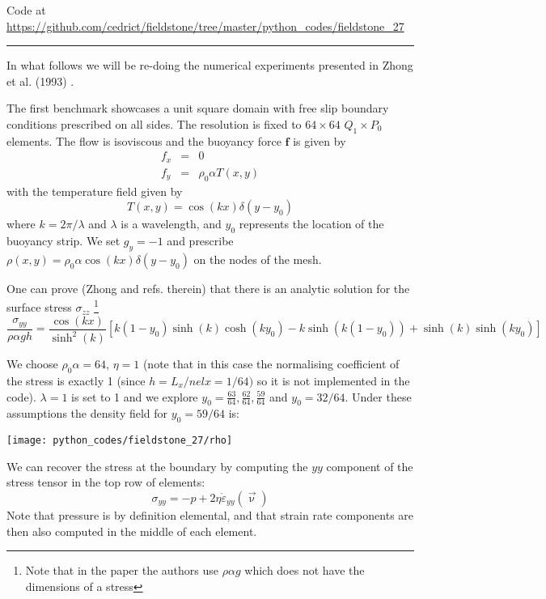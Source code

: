 

\begin{center}
Code at \url{https://github.com/cedrict/fieldstone/tree/master/python_codes/fieldstone_27}
\end{center}

\par\noindent\rule{\textwidth}{0.4pt}


In what follows we will be re-doing the numerical experiments presented in 
Zhong et al. (1993) \cite{zhgh93}.

The first benchmark showcases a unit square domain with free slip 
boundary conditions prescribed on all sides.
The resolution is fixed to $64\times64$ $Q_1 \times P_0$ elements. 
The flow is isoviscous and the buoyancy force ${\bm f}$ is given by 
\begin{eqnarray}
f_x &=& 0 \nonumber\\
f_y &=& \rho_0 \alpha T(x,y) \nonumber
\end{eqnarray}
with the temperature field given by 
\[
T(x,y) = \cos(kx) \delta(y-y_0)
\]
where $k=2\pi/\lambda$ and $\lambda$ is a wavelength, 
and $y_0$ represents the location of the buoyancy strip.
We set $g_y=-1$ and prescribe $\rho(x,y)=\rho_0 \alpha \cos(kx) \delta(y-y_0)$ on the nodes
of the mesh.

One can prove (Zhong \etal \cite{zhgh93} and refs. therein) that 
there is an analytic solution for the surface stress $\sigma_{zz}$
\footnote{Note that in the paper the authors use $\rho \alpha g$ which does not have the 
dimensions of a stress}
\[
\frac{\sigma_{yy}}{\rho \alpha g h} =
\frac{\cos (kx)}{\sinh^2(k)}
\left[
k(1-y_0)\sinh(k) \cosh(ky_0)-k \sinh(k(1-y_0))
+\sinh(k) \sinh(ky_0)
\right]
\]

We choose $\rho_0 \alpha = 64$, $\eta=1$ (note that in this case the 
normalising coefficient of the stress is exactly 1 (since $h=L_x/nelx=1/64)$ so it is not implemented in the code).
$\lambda=1$ is set to 1 and we explore $y_0 = \frac{63}{64},\frac{62}{64},\frac{59}{64}$ and $y_0=32/64$.
Under these assumptions the density field for $y_0=59/64$ is:
\begin{center}
\texttt{[image: python\_codes/fieldstone\_27/rho]}
\end{center}

We can recover the stress at the boundary by computing 
the $yy$ component of the stress tensor in the top row of elements: 
\[
\sigma_{yy} = -p + 2 \eta \dot{\varepsilon}_{yy}(\vec\upnu)
\]
Note that pressure is by definition elemental, and that strain rate
components are then also computed in the middle of each element.

